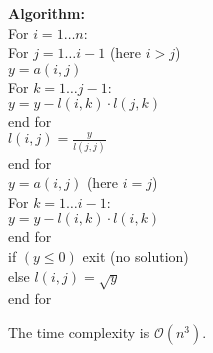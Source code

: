 \textbf{Algorithm:}\\
For $i=1 \dots n$:\\
\hspace*{0.5cm}For $j = 1 \dots i - 1$ (here $i > j$)\\
\hspace*{1cm} $y = a(i, j)$\\
\hspace*{1cm} For $k = 1 \dots j - 1$:\\
\hspace*{1.5cm} $y = y - l(i, k) \cdot l(j, k)$\\
\hspace*{1cm} end for\\
\hspace*{1cm} $l(i, j) = \frac{y}{l(j, j)}$\\
\hspace*{0.5cm} end for\\
\hspace*{0.5cm} $y = a(i, j)$ (here $i = j$)\\
\hspace*{0.5cm} For $k = 1 \dots i - 1$:\\
\hspace*{1cm} $y = y - l(i, k) \cdot l(i, k)$\\
\hspace*{0.5cm} end for\\
\hspace*{0.5cm} if $(y \le 0)$ exit (no solution)\\
\hspace*{0.5cm} else $l(i, j) = \sqrt{y}$\\
end for

The time complexity is $\mathcal{O}(n^3)$.


